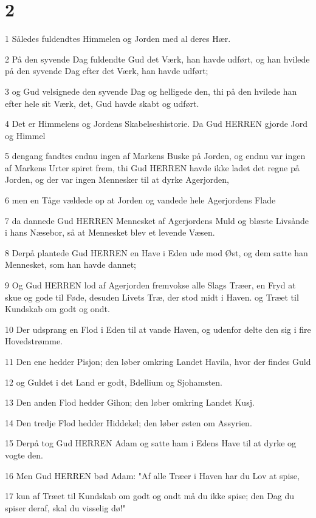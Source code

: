 \chapter{2}

\par 1 Således fuldendtes Himmelen og Jorden med al deres Hær.
\par 2 På den syvende Dag fuldendte Gud det Værk, han havde udført, og han hvilede på den syvende Dag efter det Værk, han havde udført;
\par 3 og Gud velsignede den syvende Dag og helligede den, thi på den hvilede han efter hele sit Værk, det, Gud havde skabt og udført.
\par 4 Det er Himmelens og Jordens Skabelseshistorie. Da Gud HERREN gjorde Jord og Himmel
\par 5 dengang fandtes endnu ingen af Markens Buske på Jorden, og endnu var ingen af Markens Urter spiret frem, thi Gud HERREN havde ikke ladet det regne på Jorden, og der var ingen Mennesker til at dyrke Agerjorden,
\par 6 men en Tåge vældede op at Jorden og vandede hele Agerjordens Flade
\par 7 da dannede Gud HERREN Mennesket af Agerjordens Muld og blæste Livsånde i hans Næsebor, så at Mennesket blev et levende Væsen.
\par 8 Derpå plantede Gud HERREN en Have i Eden ude mod Øst, og dem satte han Mennesket, som han havde dannet;
\par 9 Og Gud HERREN lod af Agerjorden fremvokse alle Slags Træer, en Fryd at skue og gode til Føde, desuden Livets Træ, der stod midt i Haven. og Træet til Kundskab om godt og ondt.
\par 10 Der udsprang en Flod i Eden til at vande Haven, og udenfor delte den sig i fire Hovedstrømme.
\par 11 Den ene hedder Pisjon; den løber omkring Landet Havila, hvor der findes Guld
\par 12 og Guldet i det Land er godt, Bdellium og Sjohamsten.
\par 13 Den anden Flod hedder Gihon; den løber omkring Landet Kusj.
\par 14 Den tredje Flod hedder Hiddekel; den løber østen om Assyrien.
\par 15 Derpå tog Gud HERREN Adam og satte ham i Edens Have til at dyrke og vogte den.
\par 16 Men Gud HERREN bød Adam: "Af alle Træer i Haven har du Lov at spise,
\par 17 kun af Træet til Kundskab om godt og ondt må du ikke spise; den Dag du spiser deraf, skal du visselig dø!"

